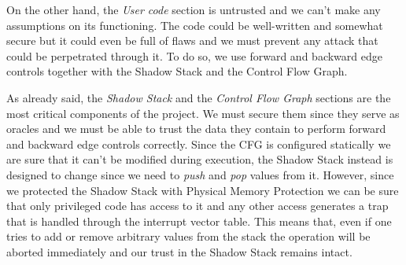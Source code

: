 On the other hand, the \textit{User code} section is untrusted and we can't make
any assumptions on its functioning. The code could be well-written and somewhat secure
but it could even be full of flaws and we must prevent any attack that could be perpetrated
through it. To do so, we use forward and backward edge controls together with the
Shadow Stack and the Control Flow Graph.

As already said, the \textit{Shadow Stack} and the \textit{Control Flow Graph}
sections are the most critical components of the project. We must secure them since
they serve as oracles and we must be able to trust the data they contain to perform
forward and backward edge controls correctly. Since the CFG is configured
statically we are sure that it can't be modified during execution, the Shadow Stack
instead is designed to change since we need to \textit{push} and \textit{pop} values
from it. However, since we protected the Shadow Stack with Physical Memory Protection
we can be sure that only privileged code has access to it and any other access generates
a trap that is handled through the interrupt vector table. This means that, even
if one tries to add or remove arbitrary values from the stack the operation will
be aborted immediately and our trust in the Shadow Stack remains intact.

